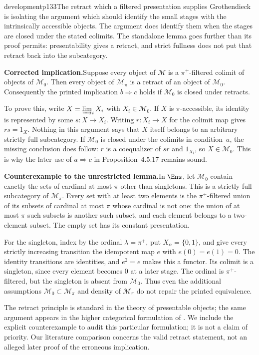 \begin{dcomment}{development}{p133}{The retract which a filtered presentation supplies}
Grothendieck is isolating the argument which should identify the small stages with the intrinsically accessible objects. The argument does identify them when the stages are closed under the stated colimits. The standalone lemma goes further than its proof permits: presentability gives a retract, and strict fullness does not put that retract back into the subcategory.

\textbf{Corrected implication.}\quad Suppose every object of $\mathcal M$ is a $\pi^+$-filtered colimit of objects of $\mathcal M_0$. Then every object of $\mathcal M_\pi$ is a retract of an object of $\mathcal M_0$. Consequently the printed implication $b\Rightarrow c$ holds if $\mathcal M_0$ is closed under retracts.

To prove this, write $X=\varinjlim_i X_i$ with $X_i\in\mathcal M_0$. If $X$ is $\pi$-accessible, its identity is represented by some $s:X\to X_i$. Writing $r:X_i\to X$ for the colimit map gives $rs=1_X$. Nothing in this argument says that $X$ itself belongs to an arbitrary strictly full subcategory. If $\mathcal M_0$ is closed under the colimits in condition~$a$, the missing conclusion does follow: $r$ is a coequalizer of $sr$ and $1_{X_i}$, so $X\in\mathcal M_0$. This is why the later use of $a\Rightarrow c$ in Proposition~4.5.17 remains sound.

\textbf{Counterexample to the unrestricted lemma.}\ours\quad In $\Ens$, let $\mathcal M_0$ contain exactly the sets of cardinal at most $\pi$ other than singletons. This is a strictly full subcategory of $\mathcal M_\pi$. Every set with at least two elements is the $\pi^+$-filtered union of its subsets of cardinal at most $\pi$ whose cardinal is not one: the union of at most $\pi$ such subsets is another such subset, and each element belongs to a two-element subset. The empty set has its constant presentation.

For the singleton, index by the ordinal $\lambda=\pi^+$, put $X_\alpha=\{0,1\}$, and give every strictly increasing transition the idempotent map $e$ with $e(0)=e(1)=0$. The identity transitions are identities, and $e^2=e$ makes this a functor. Its colimit is a singleton, since every element becomes $0$ at a later stage. The ordinal is $\pi^+$-filtered, but the singleton is absent from $\mathcal M_0$. Thus even the additional assumptions $\mathcal M_0\subset\mathcal M_\pi$ and density of $\mathcal M_\pi$ do not repair the printed equivalence.

The retract principle is standard in the theory of presentable objects; the same argument appears in the higher categorical formulation of \citet[Lemma~5.4.2.4]{Lurie2009HTT}. We include the explicit counterexample to audit this particular formulation; it is not a claim of priority. Our literature comparison concerns the valid retract statement, not an alleged later proof of the erroneous implication.
\end{dcomment}

